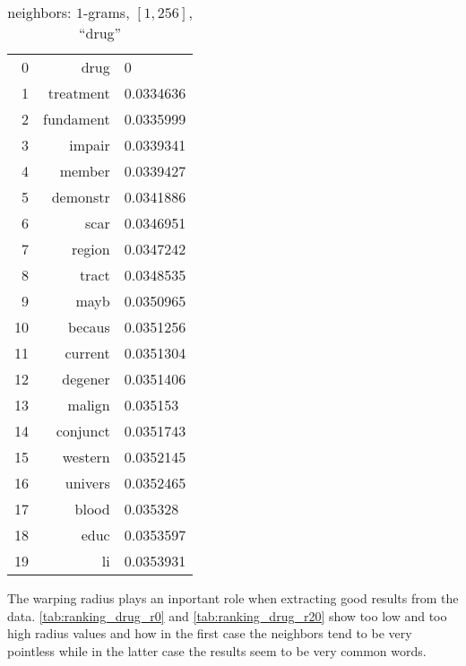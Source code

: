 \begin{table}[ht]
\begin{subtable}[t]{.45\textwidth}
\begin{tabularx}{\textwidth}{r R l}
            \midrule
            \num{0} & drug & \num{0}\\
            \num{1} & treatment & \num{0.0334636}\\
            \num{2} & fundament & \num{0.0335999}\\
            \num{3} & impair & \num{0.0339341}\\
            \midrule
            \num{4} & member & \num{0.0339427}\\
            \num{5} & demonstr & \num{0.0341886}\\
            \num{6} & scar & \num{0.0346951}\\
            \num{7} & region & \num{0.0347242}\\
            \num{8} & tract & \num{0.0348535}\\
            \num{9} & mayb & \num{0.0350965}\\
            \num{10} & becaus & \num{0.0351256}\\
            \num{11} & current & \num{0.0351304}\\
            \num{12} & degener & \num{0.0351406}\\
            \num{13} & malign & \num{0.035153}\\
            \num{14} & conjunct & \num{0.0351743}\\
            \num{15} & western & \num{0.0352145}\\
            \num{16} & univers & \num{0.0352465}\\
            \num{17} & blood & \num{0.035328}\\
            \num{18} & educ & \num{0.0353597}\\
            \num{19} & li & \num{0.0353931}\\
            \bottomrule
        \end{tabularx}
        \caption{$r = 20$}
        \label{tab:ranking_drug_r20}
    \end{subtable}
    \caption{neighbors: $1$-grams, $[1,256]$, \enquote{drug}}
    \label{tab:ranking_drug_rwrong}
\end{table}

The warping radius plays an inportant role when extracting good results from the data. \autoref{tab:ranking_drug_r0} and \autoref{tab:ranking_drug_r20} show too low and too high radius values and how in the first case the neighbors tend to be very pointless while in the latter case the results seem to be very common words.

